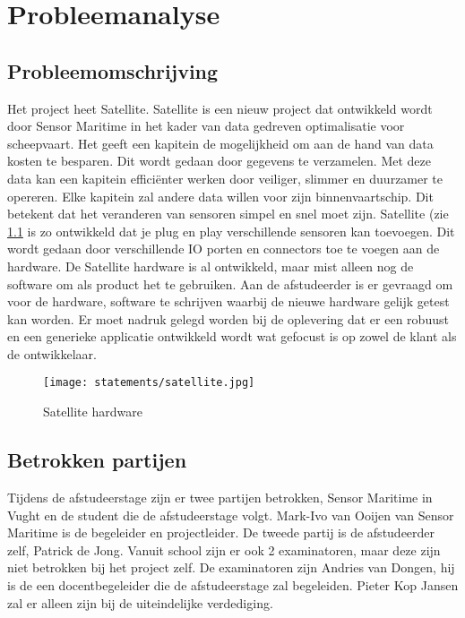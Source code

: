 \chapter{Probleemanalyse}

\section{Probleemomschrijving}
Het project heet Satellite. Satellite is een nieuw project dat ontwikkeld wordt door Sensor Maritime in het kader van data gedreven optimalisatie voor scheepvaart. Het geeft een kapitein de mogelijkheid om aan de hand van data kosten te besparen. Dit wordt gedaan door gegevens te verzamelen. Met deze data kan een kapitein efficiënter werken door veiliger, slimmer en duurzamer te opereren. Elke kapitein zal andere data willen voor zijn binnenvaartschip. Dit betekent dat het veranderen van sensoren simpel en snel moet zijn. Satellite (zie \ref{fig:shw} is zo ontwikkeld dat je plug en play verschillende sensoren kan toevoegen. Dit wordt gedaan door verschillende IO porten en connectors toe te voegen aan de hardware. De Satellite hardware is al ontwikkeld, maar mist alleen nog de software om als product het te gebruiken. Aan de afstudeerder is er gevraagd om voor de hardware, software te schrijven waarbij de nieuwe hardware gelijk getest kan worden. Er moet nadruk gelegd worden bij de oplevering dat er een robuust en een generieke applicatie ontwikkeld wordt wat gefocust is op zowel de klant als de ontwikkelaar.
\begin{figure}[h!]
	\begin{centering}
		\caption{Satellite hardware}
	\texttt{[image: statements/satellite.jpg]}

	\label{fig:shw}
	\end{centering}
\end{figure}


\section{Betrokken partijen}
Tijdens de afstudeerstage zijn er twee partijen betrokken, Sensor Maritime in Vught en de student die de afstudeerstage volgt. Mark-Ivo van Ooijen van Sensor Maritime is de begeleider en projectleider. De tweede partij is de afstudeerder zelf, Patrick de Jong. Vanuit school zijn er ook 2 examinatoren, maar deze zijn niet betrokken bij het project zelf. De examinatoren zijn Andries van Dongen, hij is de een docentbegeleider die de afstudeerstage zal begeleiden. Pieter Kop Jansen zal er alleen zijn bij de uiteindelijke verdediging.

